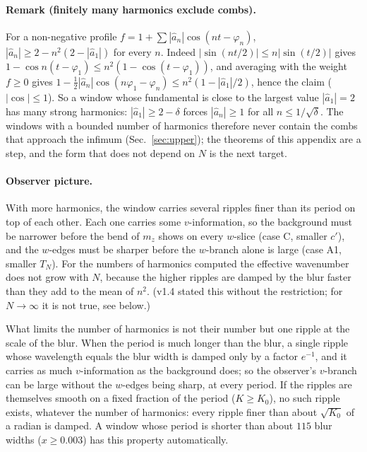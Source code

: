 \paragraph*{Remark (finitely many harmonics exclude combs).} \proofst{}
For a non-negative profile $f=1+\sum|\hat a_n|\cos(nt-\varphi_n)$, $|\hat a_n|\ge2-n^2(2-|\hat a_1|)$ for every $n$. Indeed $|\sin(nt/2)|\le n|\sin(t/2)|$ gives
$1-\cos n(t-\varphi_1)\le n^2(1-\cos(t-\varphi_1))$, and averaging with the weight $f\ge0$ gives $1-\frac12|\hat a_n|\cos(n\varphi_1-\varphi_n)\le n^2(1-|\hat a_1|/2)$, hence the claim
($|\cos|\le1$). So a window whose fundamental is close to the largest value $|\hat a_1|=2$ has many strong
harmonics: $|\hat a_1|\ge2-\delta$ forces $|\hat a_n|\ge1$ for all $n\le1/\sqrt\delta$. The windows with a bounded number of harmonics therefore never contain the combs that
approach the infimum (Sec.~\ref{sec:upper}); the theorems of this appendix are a step, and the form that does not depend on $N$ is the next target.

\paragraph*{Observer picture.}
With more harmonics, the window carries several ripples finer than its period on top of each other. Each one carries some $v$-information, so the
background must be narrower before the bend of $m_z$ shows on every $w$-slice (case C, smaller $c'$), and the $w$-edges must be sharper before
the $w$-branch alone is large (case A1, smaller $T_N$). For the numbers of harmonics computed the effective wavenumber does not grow with $N$, because the
higher ripples are damped by the blur faster than they add to the mean of $n^2$. (v1.4 stated this without the restriction; for $N\to\infty$ it is not true, see
below.)

What limits the number of harmonics is not their number but one ripple at the scale of the blur. When the period is much longer than the blur, a
single ripple whose wavelength equals the blur width is damped only by a factor $e^{-1}$, and it carries as much $v$-information as the background
does; so the observer's $v$-branch can be large without the $w$-edges being sharp, at every period. If the ripples are themselves smooth on a fixed
fraction of the period ($K\ge K_0$), no such ripple exists, whatever the number of harmonics: every ripple finer than about $\sqrt{K_0}$ of a radian is
damped. A window whose period is shorter than about $115$ blur widths ($x\ge0.003$) has this property automatically.

